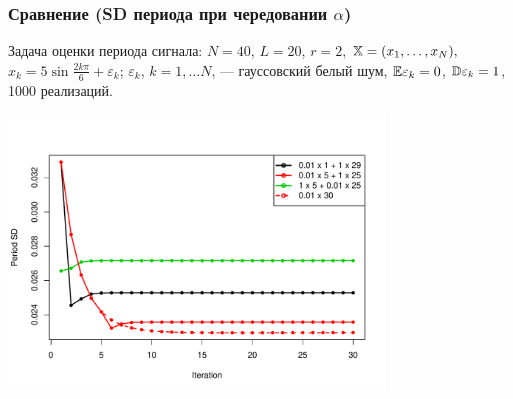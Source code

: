 \documentclass[unicode, notheorems]{beamer}
\begin{document}
\begin{frame}
	\frametitle{Сравнение (SD периода при чередовании $\alpha$)}
	Задача оценки периода сигнала: $N = 40$, $L = 20$, $r = 2$, $\mathbb{X} = (x_{1}, \ldots, x_N),$  $x_k = 5\sin{\frac{2 k \pi}{6}} + \varepsilon_k$; $\varepsilon_k$, $k = 1, \ldots N$, --- гауссовский белый шум, $\mathbb{E} \varepsilon_k = 0$, $\mathbb{D} \varepsilon_k = 1$, 1000 реализаций.
	
	\vspace{-1cm}
	\begin{center}
		\includegraphics*[width = 10cm]{esprit.pdf}
	\end{center}
\end{frame}


\end{document}
